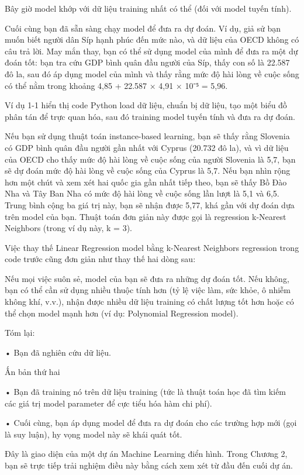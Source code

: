 Bây giờ model khớp với dữ liệu training nhất có thể (đối với model tuyến tính).

Cuối cùng bạn đã sẵn sàng chạy model để đưa ra dự đoán. Ví dụ, giả sử bạn muốn biết người dân Síp hạnh phúc đến mức nào, và dữ liệu của OECD không có câu trả lời. May mắn thay, bạn có thể sử dụng model của mình để đưa ra một dự đoán tốt: bạn tra cứu GDP bình quân đầu người của Síp, thấy con số là 22.587 đô la, sau đó áp dụng model của mình và thấy rằng mức độ hài lòng về cuộc sống có thể nằm trong khoảng 4,85 + 22.587 × 4,91 × 10⁻⁵ = 5,96.

Ví dụ 1-1 hiển thị code Python load dữ liệu, chuẩn bị dữ liệu, tạo một biểu đồ phân tán để trực quan hóa, sau đó training model tuyến tính và đưa ra dự đoán.

Nếu bạn sử dụng thuật toán instance-based learning, bạn sẽ thấy rằng Slovenia có GDP bình quân đầu người gần nhất với Cyprus (20.732 đô la), và vì dữ liệu của OECD cho thấy mức độ hài lòng về cuộc sống của người Slovenia là 5,7, bạn sẽ dự đoán mức độ hài lòng về cuộc sống của Cyprus là 5,7. Nếu bạn nhìn rộng hơn một chút và xem xét hai quốc gia gần nhất tiếp theo, bạn sẽ thấy Bồ Đào Nha và Tây Ban Nha có mức độ hài lòng về cuộc sống lần lượt là 5,1 và 6,5. Trung bình cộng ba giá trị này, bạn sẽ nhận được 5,77, khá gần với dự đoán dựa trên model của bạn. Thuật toán đơn giản này được gọi là regression k-Nearest Neighbors (trong ví dụ này, k = 3).

Việc thay thế Linear Regression model bằng k-Nearest Neighbors regression trong code trước cũng đơn giản như thay thế hai dòng sau:

Nếu mọi việc suôn sẻ, model của bạn sẽ đưa ra những dự đoán tốt. Nếu không, bạn có thể cần sử dụng nhiều thuộc tính hơn (tỷ lệ việc làm, sức khỏe, ô nhiễm không khí, v.v.), nhận được nhiều dữ liệu training có chất lượng tốt hơn hoặc có thể chọn model mạnh hơn (ví dụ: Polynomial Regression model).

Tóm lại:

• Bạn đã nghiên cứu dữ liệu.

Ấn bản thứ hai

• Bạn đã training nó trên dữ liệu training (tức là thuật toán học đã tìm kiếm các giá trị model parameter để cực tiểu hóa hàm chi phí).

• Cuối cùng, bạn áp dụng model để đưa ra dự đoán cho các trường hợp mới (gọi là suy luận), hy vọng model này sẽ khái quát tốt.

Đây là giao diện của một dự án Machine Learning điển hình. Trong Chương 2, bạn sẽ trực tiếp trải nghiệm điều này bằng cách xem xét từ đầu đến cuối dự án.

